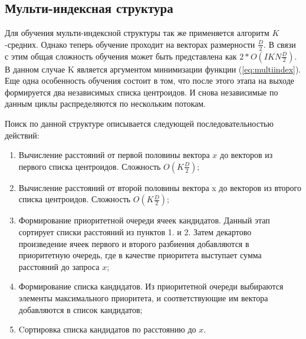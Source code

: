 \subsection{Мульти-индексная структура}

Для обучения мульти-индексной структуры так же применяется алгоритм $K$-средних. Однако теперь обучение проходит на векторах размерности $\frac{D}{2}$. В связи с этим общая сложность обучения может быть представлена как $2 * O(IKN\frac{D}{2})$. В данном случае K является аргументом минимизации функции (\ref{eq:multiindex}). Еще одна особенность обучения состоит в том, что после этого этапа на выходе формируется два независимых списка центроидов. И снова независимые по данным циклы распределяются по нескольким потокам.

Поиск по данной структуре описывается следующей последовательностью действий:
\begin{enumerate}
\item Вычисление расстояний от первой половины вектора $x$ до векторов из первого списка центроидов. Сложность $O(K\frac{D}{2})$;
\item Вычисление расстояний от второй половины вектора x до векторов из второго списка центроидов. Сложность $O(K\frac{D}{2})$;
\item Формирование приоритетной очереди ячеек кандидатов. Данный этап сортирует списки расстояний из пунктов 1. и 2. Затем декартово произведение ячеек первого и второго разбиения добавляются в приоритетную очередь, где в качестве приоритета выступает сумма расстояний до запроса $x$;
\item Формирование списка кандидатов. Из приоритетной очереди выбираются элементы максимального приоритета, и соответствующие им вектора добавляются в список кандидатов;
\item Cортировка списка кандидатов по расстоянию до $x$.
\end{enumerate}
